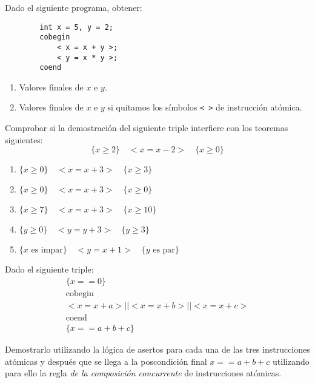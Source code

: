 \begin{ejercicio}
    Dado el siguiente programa, obtener:
    \begin{verbatim}
        int x = 5, y = 2;
        cobegin
            < x = x + y >;
            < y = x * y >;
        coend
    \end{verbatim}
    \begin{enumerate}
        \item Valores finales de $x$ e $y$.
        \item Valores finales de $x$ e $y$ si quitamos los símbolos \verb|< >| de instrucción atómica.
    \end{enumerate}
\end{ejercicio}

\begin{ejercicio}
    Comprobar si la demostración del siguiente triple interfiere con los teoremas siguientes:
    \[
        \{x \geq 2\} \quad < x = x - 2 > \quad \{x \geq 0\}
    \]
    \begin{enumerate}
        \item $\{x \geq 0\} \quad < x = x + 3 > \quad \{x \geq 3\}$
        \item $\{x \geq 0\} \quad < x = x + 3 > \quad \{x \geq 0\}$
        \item $\{x \geq 7\} \quad < x = x + 3 > \quad \{x \geq 10\}$
        \item $\{y \geq 0\} \quad < y = y + 3 > \quad \{y \geq 3\}$
        \item $\{x \text{ es impar}\} \quad < y = x + 1 > \quad \{y \text{ es par}\}$
    \end{enumerate}
\end{ejercicio}

\begin{ejercicio}
    Dado el siguiente triple:
    \begin{gather*}
        \{x == 0\} \\
        \text{cobegin} \\
        <x = x + a> || <x = x + b> || <x = x + c> \\
        \text{coend} \\
        \{x == a + b + c\}
    \end{gather*}
    
    Demostrarlo utilizando la lógica de asertos para cada una de las tres instrucciones atómicas y después que se llega a la poscondición final $x == a + b + c$ utilizando para ello la regla \emph{de la composición concurrente} de instrucciones atómicas.
\end{ejercicio}

